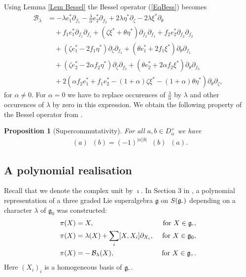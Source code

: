 \documentclass{amsart}
\newtheorem{Prop}[theorem]{Proposition}
\numberwithin{theorem}{section}
\theoremstyle{definition}
\theoremstyle{remark}
\DeclareMathOperator{\bessel}{\mathcal B_\lambda}
\newcommand{\mc}[1]{\mathcal{#1}}
\newcommand{\mg}{{\mathfrak{g}}}
\newcommand{\minus}{\scalebox{0.9}{{\rm -}}}
\newcommand{\plus}{\scalebox{0.6}{{\rm+}}}
\begin{document}
Using Lemma \ref{Lem Bessel} the Bessel operator (\ref{EqBess}) becomes
\begin{align*}
\mc B_\lambda &=-\lambda e_1^\ast \partial_{f_1}- \frac{\lambda}{\alpha} e_2^\ast\partial_{f_2}
+ 2 \lambda \eta^\ast\partial_{\zeta}- 2 \lambda \xi^\ast \partial_{\theta} \\
&\quad + f_1 e_1^\ast\partial_{f_1}\partial_{f_1 }+ (\zeta \xi^\ast+ \theta \eta^\ast)\partial_{f_2}\partial_{f_1}+ f_2 e_2^\ast\partial_{f_2}\partial_{f_2 } \\
&\quad +(\zeta e_1^\ast- 2f_1 \eta^\ast)\partial_{\zeta}\partial_{f_1 }
+( \theta e_1^\ast+2 f_1 \xi^\ast)\partial_{\theta}\partial_{f_1 } \\
&\quad +(\zeta e_2^\ast- 2 \alpha f_2 \eta^\ast)\partial_{\zeta}\partial_{f_2 }
+( \theta e_2^\ast+2 \alpha f_2 \xi^\ast)\partial_{\theta}\partial_{f_2 } \\
&\quad +2\left(\alpha f_2 e_1^\ast + f_1 e_2^\ast-(1+\alpha) \zeta \xi^\ast -(1+\alpha) \theta \eta^\ast\right)\partial_{\theta}\partial_{\zeta },
\end{align*}
for $\alpha\neq 0$. For $\alpha=0$ we have to replace occurences of $\frac{\lambda}{\alpha}$ by $\lambda$  and other occurences of   $\lambda$ by zero in this expression.  We obtain the following property of the Bessel operator from \cite[Proposition 4.2]{BC1}.

\begin{Prop}[Supercommutativity]
For all $a,b\in D_\alpha^+$ we have
\begin{align*}
\bessel(a)\bessel(b) = (-1)^{|a||b|}\bessel(b)\bessel(a).
\end{align*}
\end{Prop}

\subsection{A polynomial realisation}

Recall that we denote the complex unit by $\imath$. In Section 3 in \cite{BC1}, a polynomial representation of a three graded Lie superalgebra $\mg$ on $S(\mg_{\minus})$ depending on a character $\lambda$ of $\mg_0$ was constructed:
\begin{align*}
\pi(X)&= X,  &\text{ for } X \in \mg_{\minus}, \\
\pi(X)&= \lambda(X) + \sum_{i} [X ,X_i] \partial_{X_i},  &\text{ for } X \in \mg_0, \\
\pi(X) &= -\bessel (X), &\text{ for } X \in \mg_{\plus}. 
\end{align*}
Here $(X_i)_i$ is a homogeneous basis of $\mg_{\minus}$.
\end{document}
